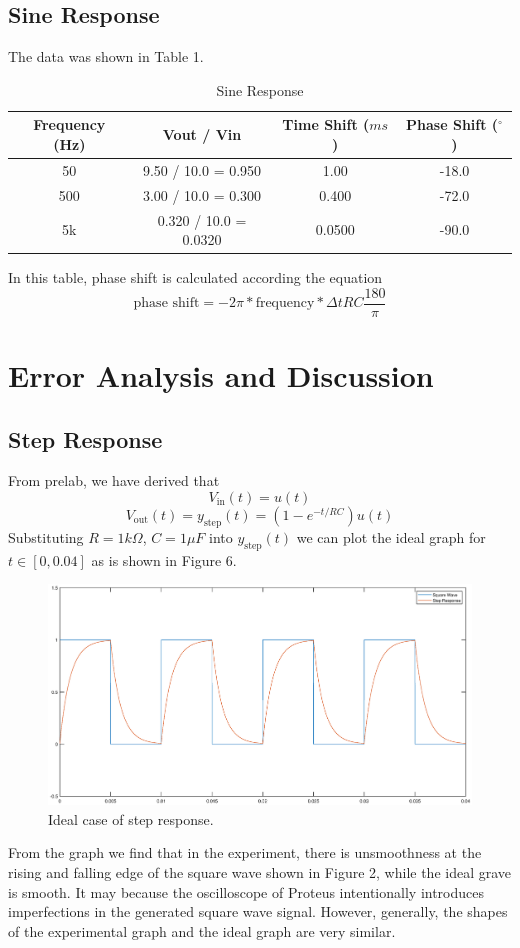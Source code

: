 \documentclass[a4paper]{article}
\begin{document}
\subsection{Sine Response}
The data was shown in Table 1.
\begin{table}[H]
	\centering
	\begin{tabular}{|c|c|c|c|}
		\hline
		Frequency (Hz)&Vout / Vin&Time Shift ($ms$)&Phase Shift ($^\circ$)\\
		\hline
		50&9.50 / 10.0 = 0.950&1.00&-18.0\\
		\hline
		500&3.00 / 10.0  = 0.300&0.400&-72.0\\
		\hline
		5k&0.320 / 10.0 = 0.0320&0.0500&-90.0\\
		\hline
	\end{tabular}
	\caption{Sine Response}
\end{table}
In this table, phase shift is calculated according the equation
$$\text{phase\ shift}=-2\pi*\text{frequency}*\Delta tRC\frac{180}{\pi}$$
\section{Error Analysis and Discussion}
\subsection{Step Response}
From prelab, we have derived that
$$V_\text{in}(t)=u(t)$$
$$V_\text{out}(t)=y_\text{step}(t)=(1-e^{-t/RC})u(t)$$
Substituting $R=1k\Omega$, $C=1\mu F$ into $y_\text{step}(t)$ we can plot the ideal graph for $t\in[0,0.04]$ as is shown in Figure 6.
\begin{figure}[H]
	\centering
	\includegraphics[width=0.8\linewidth]{6.eps}
	\caption{Ideal case of step response.}
\end{figure}
From the graph we find that in the experiment, there is unsmoothness at the rising and falling edge of the square wave shown in Figure 2, while the ideal grave is smooth. It may because the oscilloscope of Proteus intentionally introduces imperfections in the generated square wave signal. However, generally, the shapes of the experimental graph and the ideal graph are very similar.
\end{document}
